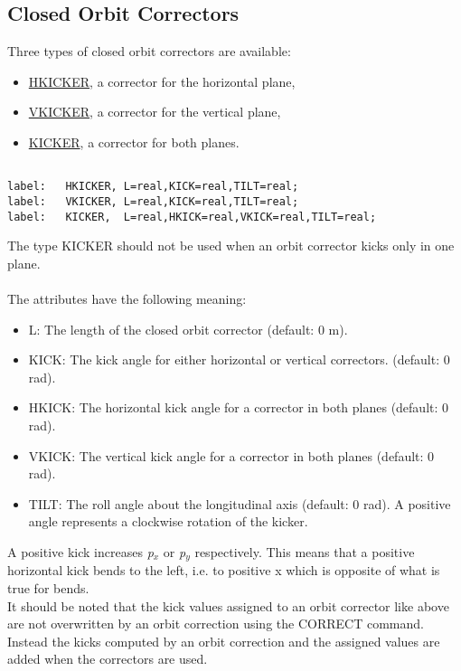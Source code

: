 






\subsection{Closed Orbit Correctors}
Three types of closed orbit correctors are available: 
\begin{itemize}
	\item \href{hkick}{HKICKER}, a corrector for the horizontal plane, 
	\item \href{vkick}{VKICKER}, a corrector for the vertical plane, 
	\item \href{kick}{KICKER}, a corrector for both planes. 
\end{itemize}
\begin{verbatim}

label:   HKICKER, L=real,KICK=real,TILT=real;
label:   VKICKER, L=real,KICK=real,TILT=real;
label:   KICKER,  L=real,HKICK=real,VKICK=real,TILT=real;
\end{verbatim} The type KICKER should not be used when an orbit corrector kicks only in one plane. 
\\
\\ The attributes have the following meaning: 
\begin{itemize}
	\item L: The length of the closed orbit corrector (default: 0 m). 
	\item KICK: The kick angle for either horizontal or vertical correctors. (default: 0 rad). 
	\item HKICK: The horizontal kick angle for a corrector in both planes (default: 0 rad). 
	\item VKICK: The vertical kick angle for a corrector in both planes (default: 0 rad). 
	\item TILT: The roll angle about the longitudinal axis (default: 0 rad). A positive angle represents a clockwise rotation of the kicker. 
\end{itemize} A positive kick increases \textit{p$_x$} or \textit{p$_y$} respectively. This means that a positive horizontal kick bends to the left,  i.e. to positive x which is opposite of what is true for bends.  
\\ It should be noted that the kick values assigned to an orbit corrector like above are not overwritten by an orbit correction using the CORRECT command. Instead the kicks computed by an orbit correction and the assigned values are added when the correctors are used. 

